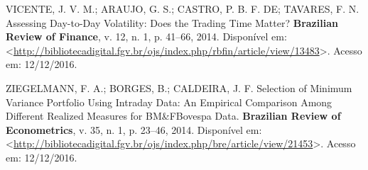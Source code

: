 \documentclass[]{article}
\begin{document}
\hypertarget{ref-vicente_assessing_2014}{}
VICENTE, J. V. M.; ARAUJO, G. S.; CASTRO, P. B. F. DE; TAVARES, F. N.
Assessing Day-to-Day Volatility: Does the Trading Time Matter?
\textbf{Brazilian Review of Finance}, v. 12, n. 1, p. 41--66, 2014.
Disponível em:
\textless{}\url{http://bibliotecadigital.fgv.br/ojs/index.php/rbfin/article/view/13483}\textgreater{}.
Acesso em: 12/12/2016.

\hypertarget{ref-ziegelmann_selection_2014}{}
ZIEGELMANN, F. A.; BORGES, B.; CALDEIRA, J. F. Selection of Minimum
Variance Portfolio Using Intraday Data: An Empirical Comparison Among
Different Realized Measures for BM\&FBovespa Data. \textbf{Brazilian
Review of Econometrics}, v. 35, n. 1, p. 23--46, 2014. Disponível em:
\textless{}\url{http://bibliotecadigital.fgv.br/ojs/index.php/bre/article/view/21453}\textgreater{}.
Acesso em: 12/12/2016.
\end{document}
